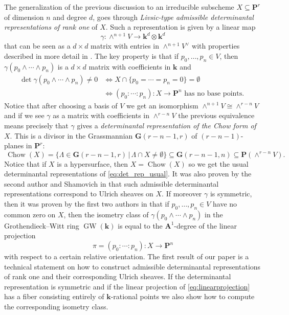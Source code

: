 \documentclass[12pt]{amsart}
\numberwithin{equation}{section}
\numberwithin{thmcounter}{section}
\theoremstyle{definition}
\theoremstyle{claim}
\newcommand{\kk}{\mathbf{k}}
\newcommand{\nG}{\mathbf{G}}
\newcommand{\nP}{\mathbf{P}}
\newcommand{\nA}{\mathbf{A}}
\DeclareMathOperator{\GW}{GW}
\begin{document}
The generalization of the previous discussion to an irreducible subscheme $X\subseteq \nP^r$ of dimension $n$ and degree $d$, goes through  \emph{Livsic-type admissible determinantal representations of rank one} of $X$. Such a representation is given by  a linear map
\[ \gamma\colon \wedge^{n+1}V \longrightarrow \kk^d\otimes \kk^d \]
that can be seen as a $d\times d$ matrix with entries in $\wedge^{n+1}V^{\vee}$ with properties described in more detail in \cite{shamovichvinnikov}. The key property is that if $p_0,\ldots,p_n\in V$, then $\gamma(p_0\wedge \cdots\wedge p_n)$ is a $d\times d$ matrix with coefficients in $\kk$ and
\begin{align*} 
\det \gamma(p_0\wedge \cdots \wedge p_n) \ne 0 &\iff  X\cap \{ p_0=\cdots =p_n = 0\} = \emptyset \\
& \iff (p_0:\cdots:p_n)\colon X \longrightarrow \nP^n \text{ has no base points. } 
\end{align*}
Notice that after choosing a basis of $V$ we get an  isomorphism $\wedge^{n+1}V \cong \wedge^{r-n}V$ and if we see $\gamma$ as a matrix with coefficients in $\wedge^{r-n}V$ the previous equivalence means precisely that $\gamma$ gives a \emph{determinantal representation of the Chow form of $X$}. This is a divisor in the Grassmannian $\nG(r-n-1,r)$ of $(r-n-1)$-planes in $\nP^r$:
\[ \ \operatorname{Chow}(X) = \{ \Lambda\in \nG(r-n-1,r) \,|\, \Lambda\cap X \ne \emptyset \} \subseteq \nG(r-n-1,n) \subseteq \nP(\wedge^{r-n}V).  \]  
Notice that if $X$ is a hypersurface, then $X=\operatorname{Chow}(X)$ so we get the usual determinantal representations of \eqref{eq:det_rep_usual}. It was also proven by the second author and Shamovich in \cite{kummershamovich} that such admissible determinantal representations correspond to Ulrich sheaves on $X$. If moreover $\gamma$ is symmetric, then it was proven by the first two authors in \cite{agostinikummer} that if $p_0,\ldots,p_n\in V$ have no common zero on $X$, then the isometry class of $\gamma(p_0\wedge \cdots \wedge p_n)$ in the Grothendieck--Witt ring $\GW(\kk)$ is equal to the $\nA^1$-degree of the linear projection
\begin{equation}\label{eq:linearprojection} 
\pi = (p_0:\cdots:p_n)\colon X \longrightarrow \nP^n 
\end{equation}
with respect to a certain relative orientation. The first result of our paper is a technical statement on how to construct admissible determinantal representations of rank one and their corresponding Ulrich sheaves. If the determinantal representation is symmetric and if the linear  projection of \eqref{eq:linearprojection} has a fiber consisting entirely of $\kk$-rational points we also show how to compute the corresponding isometry class.
\end{document}
